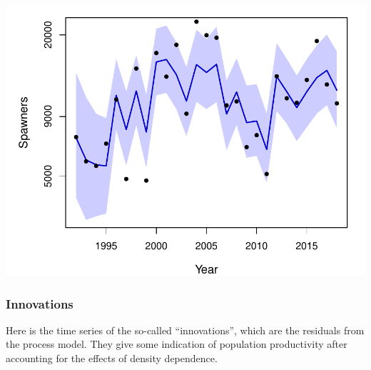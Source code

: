 \documentclass[
  11pt,
]{article}
\begin{document}
\includegraphics{App_2_Summarize_results_Summer_Fall_Chinook_files/figure-latex/plot_escapement-1.pdf}

\hypertarget{innovations}{%
\subsubsection{Innovations}\label{innovations}}

Here is the time series of the so-called ``innovations'', which are the
residuals from the process model. They give some indication of
population productivity after accounting for the effects of density
dependence.
\end{document}
